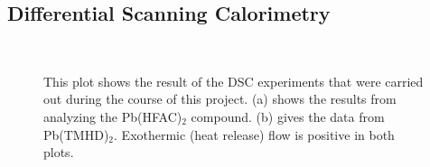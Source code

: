 
\subsection{Differential Scanning Calorimetry}

\begin{figure}[htbp]
   \centering
    \\
   \caption[Results of DSC Experiments]%
   		{This plot shows the result of the DSC experiments that were carried out during the course of %
		this project. (a) shows the results from analyzing the Pb(HFAC)$_{2}$ compound. (b) gives %
		the data from Pb(TMHD)$_{2}$. Exothermic (heat release) flow is positive in both plots. }
   \label{fig:DSC-Data}
\end{figure}


